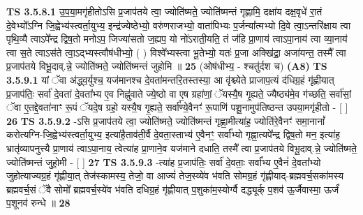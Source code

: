 \documentclass[17pt]{extarticle}
\begin{document}
                                        \textbf{ TS 3.5.8.1} \newline
                  उ॒प॒या॒मगृ॑हीतोऽसि प्र॒जाप॑तये त्वा॒ ज्योति॑ष्मते॒ ज्योति॑ष्मन्तं गृह्णामि॒ दक्षा॑य दक्ष॒वृधे॑ रा॒तं दे॒वेभ्यो᳚ऽग्नि जि॒ह्वेभ्य॑स्त्वर्ता॒युभ्य॒ इन्द्र॑ज्येष्ठेभ्यो॒ वरु॑णराजभ्यो॒ वाता॑पिभ्यः प॒र्जन्या᳚त्मभ्यो दि॒वे त्वा॒ऽन्तरि॑क्षाय त्वा पृथि॒व्यै त्वाऽपे᳚न्द्र द्विष॒तो मनोऽप॒ जिज्या॑सतो ज॒ह्यप॒ यो नो॑ऽराती॒यति॒ तं ज॑हि प्रा॒णाय॑ त्वाऽपा॒नाय॑ त्वा व्या॒नाय॑ त्वा स॒ते त्वाऽस॑ते त्वा॒ऽद्भ्यस्त्वौष॑धीभ्यो॒ ( ) विश्वे᳚भ्यस्त्वा भू॒तेभ्यो॒ यतः॑ प्र॒जा अक्खि॑द्रा॒ अजा॑यन्त॒ तस्मै᳚ त्वा प्र॒जाप॑तये विभू॒दाव्.न्ने॒ ज्योति॑ष्मते॒ ज्योति॑ष्मन्तं जुहोमि ॥ \textbf{  25 } \newline
                  \newline
                      (ओष॑धीभ्य॒ - श्चतु॑र्दश च)  \textbf{(A8)} \newline \newline
                                        \textbf{ TS 3.5.9.1} \newline
                  यां ॅवा अ॑द्ध्व॒र्युश्च॒ यज॑मानश्च दे॒वता॑मन्तरि॒तस्तस्या॒ आ वृ॑श्च्येते प्राजाप॒त्यं द॑धिग्र॒हं गृ॑ह्णीयात् प्र॒जाप॑तिः॒ सर्वा॑ दे॒वता॑ दे॒वता᳚भ्य ए॒व निह्नु॑वाते ज्ये॒ष्ठो वा ए॒ष ग्रहा॑णां॒ ॅयस्यै॒ष गृ॒ह्यते॒ ज्यैष्ठ्य॑मे॒व ग॑च्छति॒ सर्वा॑सां॒ ॅवा ए॒तद्दे॒वता॑नाꣳ रू॒पं ॅयदे॒ष ग्रहो॒ यस्यै॒ष गृ॒ह्यते॒ सर्वा᳚ण्ये॒वैनꣳ॑ रू॒पाणि॑ पशू॒नामुप॑तिष्ठन्त उपया॒मगृ॑हीतो - [  ] \textbf{  26} \newline
                  \newline
                                \textbf{ TS 3.5.9.2} \newline
                  -ऽसि प्र॒जाप॑तये त्वा॒ ज्योति॑ष्मते॒ ज्योति॑ष्मन्तं गृह्णा॒मीत्या॑ह॒ ज्योति॑रे॒वैनꣳ॑ समा॒नानां᳚ करोत्यग्नि-जि॒ह्वेभ्य॑स्त्वर्ता॒युभ्य॒ इत्या॑है॒ताव॑ती॒र्वै दे॒वता॒स्ताभ्य॑ ए॒वैनꣳ॒॒ सर्वा᳚भ्यो गृह्णा॒त्यपे᳚न्द्र द्विष॒तो मन॒ इत्या॑ह॒ भ्रातृ॑व्यापनुत्त्यै प्रा॒णाय॑ त्वाऽपा॒नाय॒ त्वेत्या॑ह प्रा॒णाने॒व यज॑माने दधाति॒ तस्मै᳚ त्वा प्र॒जाप॑तये विभू॒दाव्.न्ने॒ ज्योति॑ष्मते॒ ज्योति॑ष्मन्तं जुहो॒मी - [  ] \textbf{  27} \newline
                  \newline
                                \textbf{ TS 3.5.9.3} \newline
                  -त्या॑ह प्र॒जाप॑तिः॒ सर्वा॑ दे॒वताः॒ सर्वा᳚भ्य ए॒वैनं॑ दे॒वता᳚भ्यो जुहोत्याज्यग्र॒हं गृ॑ह्णीया॒त् तेज॑स्कामस्य॒ तेजो॒ वा आज्यं॑ तेज॒स्व्ये॑व भ॑वति सोमग्र॒हं गृ॑ह्णीयाद्-ब्रह्मवर्च॒सका॑मस्य ब्रह्मवर्च॒सं ॅवै सोमो᳚ ब्रह्मवर्च॒स्ये॑व भ॑वति दधिग्र॒हं गृ॑ह्णीयात् प॒शुका॑म॒स्योर्ग्वै दद्ध्यूर्क् प॒शव॑ ऊ॒र्जैवास्मा॒ ऊर्जं॑ प॒शूनव॑ रुन्धे ॥ \textbf{  28} \newline
\end{document}
